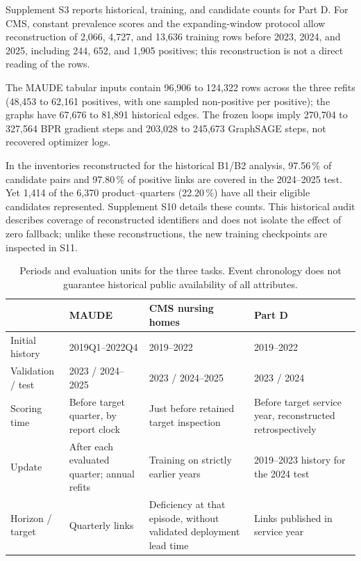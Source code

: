 Supplement S3 reports historical, training, and candidate counts for Part D. For CMS, constant prevalence scores and the expanding-window protocol allow reconstruction of 2,066, 4,727, and 13,636 training rows before 2023, 2024, and 2025, including 244, 652, and 1,905 positives; this reconstruction is not a direct reading of the rows.

The MAUDE tabular inputs contain 96,906 to 124,322 rows across the three refits (48,453 to 62,161 positives, with one sampled non-positive per positive); the graphs have 67,676 to 81,891 historical edges. The frozen loops imply 270,704 to 327,564 BPR gradient steps and 203,028 to 245,673 GraphSAGE steps, not recovered optimizer logs.

In the inventories reconstructed for the historical B1/B2 analysis, 97.56\,\% of candidate pairs and 97.80\,\% of positive links are covered in the 2024--2025 test. Yet 1,414 of the 6,370 product--quarters (22.20\,\%) have all their eligible candidates represented. Supplement S10 details these counts. This historical audit describes coverage of reconstructed identifiers and does not isolate the effect of zero fallback; unlike these reconstructions, the new training checkpoints are inspected in S11.

\begin{table}[!htbp]
\centering\footnotesize
\caption{Periods and evaluation units for the three tasks. Event chronology does not guarantee historical public availability of all attributes.}
\label{tab:time}
\begin{tabularx}{\linewidth}{@{}lXXX@{}}
\toprule
 & MAUDE & CMS nursing homes & Part D\\
\midrule
Initial history & 2019Q1--2022Q4 & 2019--2022 & 2019--2022\\
Validation / test & 2023 / 2024--2025 & 2023 / 2024--2025 & 2023 / 2024\\
Scoring time & Before target quarter, by report clock & Just before retained target inspection & Before target service year, reconstructed retrospectively\\
Update & After each evaluated quarter; annual refits & Training on strictly earlier years & 2019--2023 history for the 2024 test\\
Horizon / target & Quarterly links & Deficiency at that episode, without validated deployment lead time & Links published in service year\\
\bottomrule
\end{tabularx}
\end{table}

